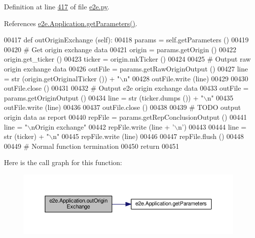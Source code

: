 Definition at line \hyperlink{e2e_8py_source_l00417}{417} of file \hyperlink{e2e_8py_source}{e2e.\+py}.



References \hyperlink{e2e_8py_source_l00386}{e2e.\+Application.\+get\+Parameters()}.


\begin{DoxyCode}
00417     \textcolor{keyword}{def }outOriginExchange (self):
00418         params = self.getParameters ()
00419         
00420         \textcolor{comment}{# Get origin exchange data}
00421         origin = params.getOrigin ()
00422         origin.get\_ticker ()
00423         ticker = origin.mkTicker ()
00424 
00425         \textcolor{comment}{# Output raw origin exchange data}
00426         outFile = params.getRawOriginOutput ()
00427         line = str (origin.getOriginalTicker ()) + \textcolor{stringliteral}{"\(\backslash\)n"}
00428         outFile.write (line)
00429         
00430         outFile.close ()
00431     
00432         \textcolor{comment}{# Output e2e origin exchange data}
00433         outFile = params.getOriginOutput ()
00434         line = str (ticker.dumps ()) + \textcolor{stringliteral}{"\(\backslash\)n"}
00435         outFile.write (line)
00436         
00437         outFile.close ()
00438         
00439         \textcolor{comment}{# TODO output origin data as report}
00440         repFile = params.getRepConclusionOutput ()
00441         line = \textcolor{stringliteral}{"\(\backslash\)nOrigin exchange"}
00442         repFile.write (line + \textcolor{stringliteral}{'\(\backslash\)n'})
00443         
00444         line = str (ticker) + \textcolor{stringliteral}{"\(\backslash\)n"}
00445         repFile.write (line)
00446         
00447         repFile.flush ()
00448     
00449         \textcolor{comment}{# Normal function termination }
00450         \textcolor{keywordflow}{return} 
00451     
\end{DoxyCode}
Here is the call graph for this function\+:
\nopagebreak
\begin{figure}[H]
\begin{center}
\leavevmode
\includegraphics[width=350pt]{classe2e_1_1_application_adfad90d64cddb8d751961202264ca489_cgraph}
\end{center}
\end{figure}
\mbox{\label{classe2e_1_1_application_a91b8b6df6456d27bed503849ffcdcc77}} 
